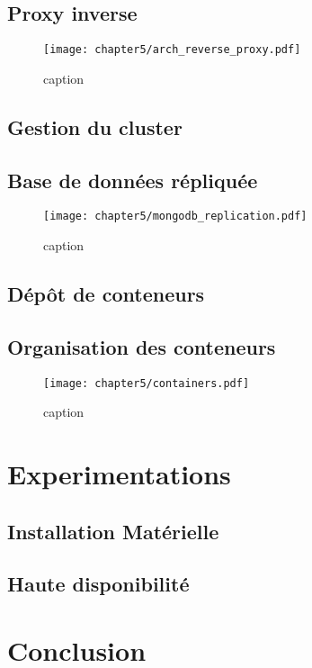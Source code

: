 \subsection{Proxy inverse}

\begin{figure}[H]
	\centering
	\texttt{[image: chapter5/arch\_reverse\_proxy.pdf]}
        \caption{caption}
	\label{fig:arch_reverse_proxy}
\end{figure}

\subsection{Gestion du cluster}

\subsection{Base de données répliquée}

\begin{figure}[H]
	\centering
	\texttt{[image: chapter5/mongodb\_replication.pdf]}
        \caption{caption}
	\label{fig:mongodb_replication}
\end{figure}

\subsection{Dépôt de conteneurs}

\subsection{Organisation des conteneurs}

\begin{figure}[H]
	\centering
	\texttt{[image: chapter5/containers.pdf]}
        \caption{caption}
	\label{fig:containers}
\end{figure}


\section{Experimentations}

\subsection{Installation Matérielle}

\subsection{Haute disponibilité}

\section{Conclusion}